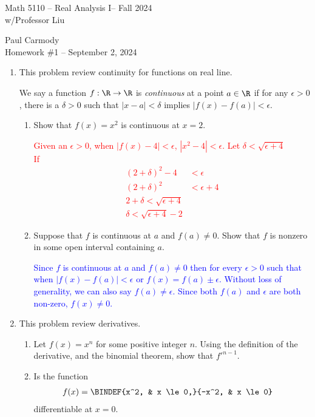 \documentclass[10pt,a4paper]{report}
\newcommand{\CLASSNAME}{Math 5110 -- Real Analysis I}
\newcommand{\STUDENTNAME}{Paul Carmody}
\newcommand{\ASSIGNMENT}{Homework \#1 }
\newcommand{\DUEDATE}{September 2, 2024}
\newcommand{\SEMESTER}{Fall 2024}
\newcommand{\RED}[1]{\textcolor{red}{#1}}
\newcommand{\BLUE}[1]{\textcolor{blue}{#1}}
\begin{document}
\begin{center}
	\Large{\CLASSNAME -- \SEMESTER} \\
	\large{ w/Professor Liu}
\end{center}
\begin{center}
	\STUDENTNAME \\
	\ASSIGNMENT -- \DUEDATE\\
\end{center} 

\begin{enumerate}[label=\Roman*.]
\item This problem review continuity for functions on real line.

We say a function $f: \R \to \R$ is \textit{continuous} at a point $a \in \R$ if for any $\epsilon > 0$, there is a $\delta > 0$ such that $|x-a| < \delta$ implies $|f(x)-f(a)|< \epsilon$.
\begin{enumerate}[label=(\alph*)]
\item Show that $f(x)=x^2$ is continuous at $x=2$.

\RED{Given an $\epsilon > 0$, when $|f(x)-4|< \epsilon$, $ |x^2 -4| < \epsilon$.  Let $\delta < \sqrt{\epsilon + 4}$ \\
If \begin{align*}
	(2+\delta)^2-4 &< \epsilon \\
	(2+\delta)^2&< \epsilon +4\\
	2+\delta < \sqrt{\epsilon +4} \\
	\delta < \sqrt{\epsilon+4}-2
\end{align*} }

\item Suppose that $f$ is continuous at $a$ and $f(a) \ne 0$. Show that $f$ is nonzero in some open interval containing $a$.

\BLUE{Since $f$ is continuous at $a$ and $f(a) \ne 0$ then for every $\epsilon > 0$ such that when $|f(x)-f(a)| < \epsilon$ or $f(x) = f(a) \pm \epsilon$. Without loss of generality, we can also say $f(a) \ne \epsilon$. Since both $f(a)$ and $\epsilon$ are both non-zero, $f(x) \ne 0$. }

\end{enumerate}

\item This problem review derivatives.
\begin{enumerate}[label=(\alph*)]
\item Let $f(x)=x^n$ for some positive integer $n$.  Using the definition of the derivative, and the binomial theorem, show that $f'^{n-1}$.
\item Is the function 
\begin{align*}
	f(x) &= \BINDEF{x^2, & x \le 0,}{-x^2, & x \le 0}
\end{align*}differentiable at $x=0$.


\end{enumerate}
\end{enumerate}
\end{document}
